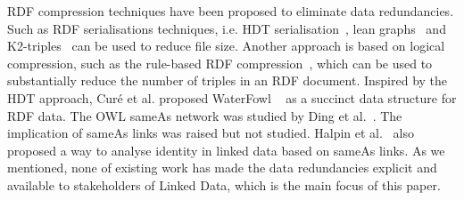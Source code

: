 RDF compression techniques have been proposed to eliminate data redundancies. Such as RDF serialisations techniques, i.e. HDT serialisation~\cite{fernandez2013binary}, lean graphs~\cite{iannone2005optimizing} and K2-triples~\cite{alvarez2011compressed} can be used to reduce file size. Another approach is based on logical compression, such as the rule-based RDF compression~\cite{joshi2013logical}, which can be used to substantially reduce the number of triples in an RDF document. Inspired by the HDT approach, Cur{\'e} et al. proposed WaterFowl ~\cite{cure2014waterfowl} as a succinct data structure for RDF data. The OWL sameAs network was studied by Ding et al.~\cite{ding2010sameas}. The implication of sameAs links was raised but not studied. Halpin et al.~\cite{halpin2010owl} also proposed a way to analyse identity in linked data based on sameAs links. As we mentioned, none of existing work has made the data redundancies explicit and available to stakeholders of Linked Data, which is the main focus of this paper.